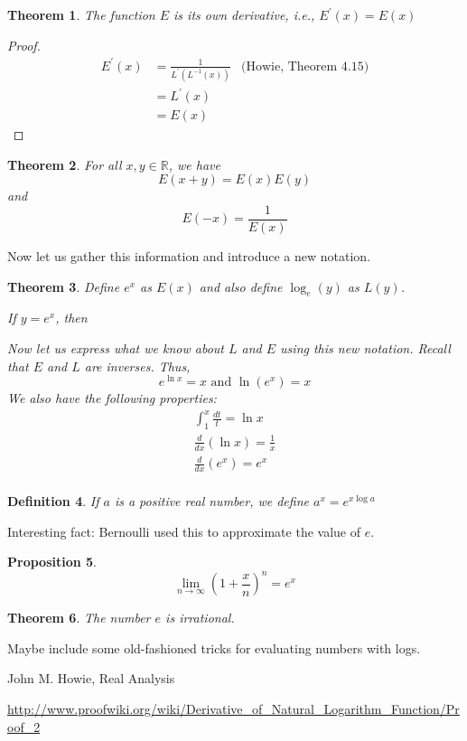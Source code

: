 \documentclass[12pt]{article}
\theoremstyle{mystyle}
\newtheorem{thm}{Theorem}
\newtheorem{defn}[thm]{Definition}
\newtheorem{prop}[thm]{Proposition}
\newcommand{\R}{\mathbb{R}}
\begin{document}
\begin{thm}
  The function $E$ is its own derivative, i.e., $E^\prime(x) = E(x)$
\end{thm}
\begin{proof}
  \begin{align*}
    E^\prime(x) 
        &= \frac{1}{L^\prime(L^{-1}(x))}  & \text{(Howie, Theorem 4.15)} \\
        &= L^\prime(x) \\
        &= E(x)
  \end{align*}
\end{proof}


\begin{thm}
  For all $x,y \in \R$, we have
  $$ E(x+y) = E(x)E(y) $$
  and
  $$ E(-x) = \frac{1}{E(x)}$$
\end{thm}

Now let us gather this information and introduce a new notation.

\begin{thm}
  Define $e^x$ as $E(x)$ and also define $\log_e (y)$ as $L(y)$. 
  
  If $y = e^x$, then 
  
  Now let us express what we know about $L$ and $E$ using this new notation.
  Recall that $E$ and $L$ are inverses. Thus,
  $$ e^{\ln x} = x \text{ and } \ln(e^x) = x $$
  We also have the following properties:
  \begin{align*}
    \int_{1}^x \frac{dt}{t} = \ln x \\
    \frac{d}{dx}(\ln x) = \frac{1}{x} \\
    \frac{d}{dx}(e^x) = e^x \\
  \end{align*}
    
\end{thm}


\begin{defn}
  If $a$ is a positive real number, we define
  $a^x = e^{x \log a}$
\end{defn}


Interesting fact: Bernoulli used this to approximate the value of $e$.
\begin{prop}
  $$ \lim_{n \to \infty} \left( 1 + \frac{x}{n} \right)^n = e^x $$
\end{prop}


\begin{thm}
  The number $e$ is irrational. 
\end{thm}


Maybe include some old-fashioned tricks for evaluating numbers with logs.

\begin{thebibliography}{10}

John M. Howie, Real Analysis

\url{http://www.proofwiki.org/wiki/Derivative_of_Natural_Logarithm_Function/Proof_2}

\end{thebibliography}
\end{document}
